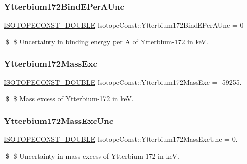 \subsubsection{\texorpdfstring{Ytterbium172\+Bind\+E\+Per\+A\+Unc}{Ytterbium172BindEPerAUnc}}
{\footnotesize\ttfamily \mbox{\hyperlink{group___isotope_const-_macros_ga8f45a7272ce02c0b4c65c44636ed719a}{I\+S\+O\+T\+O\+P\+E\+C\+O\+N\+S\+T\+\_\+\+D\+O\+U\+B\+LE}} Isotope\+Const\+::\+Ytterbium172\+Bind\+E\+Per\+A\+Unc = 0}

\$ \$ Uncertainty in binding energy per A of Ytterbium-\/172 in keV. \mbox{\label{group___isotope_const-_ytterbium-_yb172_ga302fd5cc975241f64ac0739c1ceb159e}} 
\subsubsection{\texorpdfstring{Ytterbium172\+Mass\+Exc}{Ytterbium172MassExc}}
{\footnotesize\ttfamily \mbox{\hyperlink{group___isotope_const-_macros_ga8f45a7272ce02c0b4c65c44636ed719a}{I\+S\+O\+T\+O\+P\+E\+C\+O\+N\+S\+T\+\_\+\+D\+O\+U\+B\+LE}} Isotope\+Const\+::\+Ytterbium172\+Mass\+Exc = -\/59255.}

\$ \$ Mass excess of Ytterbium-\/172 in keV. \mbox{\label{group___isotope_const-_ytterbium-_yb172_gaa05d8fedf942a713904a49c8ae9bebde}} 
\subsubsection{\texorpdfstring{Ytterbium172\+Mass\+Exc\+Unc}{Ytterbium172MassExcUnc}}
{\footnotesize\ttfamily \mbox{\hyperlink{group___isotope_const-_macros_ga8f45a7272ce02c0b4c65c44636ed719a}{I\+S\+O\+T\+O\+P\+E\+C\+O\+N\+S\+T\+\_\+\+D\+O\+U\+B\+LE}} Isotope\+Const\+::\+Ytterbium172\+Mass\+Exc\+Unc = 0.}

\$ \$ Uncertainty in mass excess of Ytterbium-\/172 in keV. \mbox{\label{group___isotope_const-_ytterbium-_yb172_ga3f256895c8d15996708e2ad72d1a1223}} 
